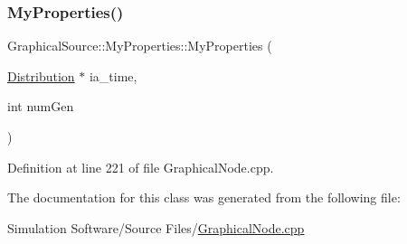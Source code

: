 \subsubsection{\texorpdfstring{My\+Properties()}{MyProperties()}\hspace{0.1cm}{\footnotesize\ttfamily [2/2]}}
{\footnotesize\ttfamily Graphical\+Source\+::\+My\+Properties\+::\+My\+Properties (\begin{DoxyParamCaption}\item[{\hyperlink{class_distribution}{Distribution} $\ast$}]{ia\+\_\+time,  }\item[{int}]{num\+Gen }\end{DoxyParamCaption})\hspace{0.3cm}{\ttfamily [inline]}}



Definition at line 221 of file Graphical\+Node.\+cpp.



The documentation for this class was generated from the following file\+:\begin{DoxyCompactItemize}
\item 
Simulation Software/\+Source Files/\hyperlink{_graphical_node_8cpp}{Graphical\+Node.\+cpp}\end{DoxyCompactItemize}
